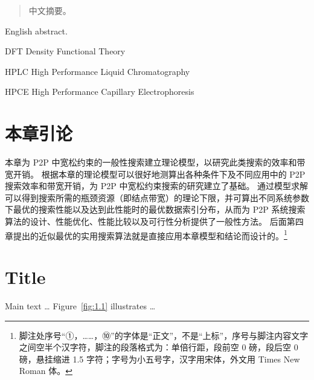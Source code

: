 \documentclass[degree=doctor,language=english]{thuthesis}
\begin{document}
\START
\showoutput

\begin{committee}
\end{committee}

\frontmatter

\begin{abstract}
  中文摘要。
\end{abstract}

\begin{abstract*}
  English abstract.
\end{abstract*}

\tableofcontents

\listoffiguresandtables

\begin{denotation}
  \item[DFT] Density Functional Theory
  \item[HPLC] High Performance Liquid Chromatography
  \item[HPCE] High Performance Capillary Electrophoresis
\end{denotation}

\mainmatter

\section{本章引论}

本章为 P2P 中宽松约束的一般性搜索建立理论模型，以研究此类搜索的效率和带宽开销。
根据本章的理论模型可以很好地测算出各种条件下及不同应用中的 P2P 搜索效率和带宽开销，为 P2P 中宽松约束搜索的研究建立了基础。
通过模型求解可以得到搜索所需的瓶颈资源（即结点带宽）的理论下限，并可算出不同系统参数下最优的搜索性能以及达到此性能时的最优数据索引分布，从而为 P2P 系统搜索算法的设计、性能优化、性能比较以及可行性分析提供了一般性方法。
后面第四章提出的近似最优的实用搜索算法就是直接应用本章模型和结论而设计的。\footnote{%
  脚注处序号“①，……，⑩”的字体是“正文”，不是“上标”，序号与脚注内容文字之间空半个汉字符，脚注的段落格式为：单倍行距，段前空 0 磅，段后空 0 磅，悬挂缩进 1.5 字符；字号为小五号字，汉字用宋体，外文用 Times New Roman 体。
}

\section{Title}

Main text … Figure~\ref{fig:1.1} illustrates …
\end{document}
